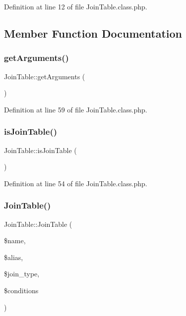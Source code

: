Definition at line 12 of file Join\+Table.\+class.\+php.



\subsection{Member Function Documentation}
\mbox{\label{classJoinTable_a2f8aae7c1c5d0879f1085b9280018b4e}} 
\subsubsection{\texorpdfstring{get\+Arguments()}{getArguments()}}
{\footnotesize\ttfamily Join\+Table\+::get\+Arguments (\begin{DoxyParamCaption}{ }\end{DoxyParamCaption})}



Definition at line 59 of file Join\+Table.\+class.\+php.

\mbox{\label{classJoinTable_aa26630df96bb0dac2ddcccff34c91530}} 
\subsubsection{\texorpdfstring{is\+Join\+Table()}{isJoinTable()}}
{\footnotesize\ttfamily Join\+Table\+::is\+Join\+Table (\begin{DoxyParamCaption}{ }\end{DoxyParamCaption})}



Definition at line 54 of file Join\+Table.\+class.\+php.

\mbox{\label{classJoinTable_a70859ad638b9149e97b8209d4f73610e}} 
\subsubsection{\texorpdfstring{Join\+Table()}{JoinTable()}}
{\footnotesize\ttfamily Join\+Table\+::\+Join\+Table (\begin{DoxyParamCaption}\item[{}]{\$name,  }\item[{}]{\$alias,  }\item[{}]{\$join\+\_\+type,  }\item[{}]{\$conditions }\end{DoxyParamCaption})}

